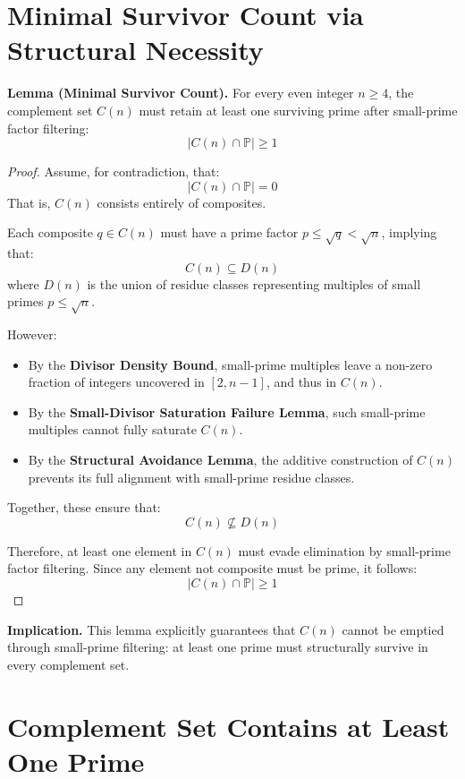 \documentclass[11pt]{article}
\begin{document}
	\section{Minimal Survivor Count via Structural Necessity}
	
	\textbf{Lemma (Minimal Survivor Count).}  
	For every even integer \( n \geq 4 \), the complement set \( C(n) \) must retain at least one surviving prime after small-prime factor filtering:
	\[
	|C(n) \cap \mathbb{P}| \geq 1
	\]
	
	\begin{proof}
		Assume, for contradiction, that:
		\[
		|C(n) \cap \mathbb{P}| = 0
		\]
		That is, \( C(n) \) consists entirely of composites.
		
		Each composite \( q \in C(n) \) must have a prime factor \( p \leq \sqrt{q} < \sqrt{n} \), implying that:
		\[
		C(n) \subseteq D(n)
		\]
		where \( D(n) \) is the union of residue classes representing multiples of small primes \( p \leq \sqrt{n} \).
		
		However:
		\begin{itemize}
			\item By the \textbf{Divisor Density Bound}, small-prime multiples leave a non-zero fraction of integers uncovered in \([2, n-1]\), and thus in \( C(n) \).
			\item By the \textbf{Small-Divisor Saturation Failure Lemma}, such small-prime multiples cannot fully saturate \( C(n) \).
			\item By the \textbf{Structural Avoidance Lemma}, the additive construction of \( C(n) \) prevents its full alignment with small-prime residue classes.
		\end{itemize}
		
		Together, these ensure that:
		\[
		C(n) \not\subseteq D(n)
		\]
		
		Therefore, at least one element in \( C(n) \) must evade elimination by small-prime factor filtering. Since any element not composite must be prime, it follows:
		\[
		|C(n) \cap \mathbb{P}| \geq 1
		\]
	\end{proof}
	
	\textbf{Implication.}  
	This lemma explicitly guarantees that \( C(n) \) cannot be emptied through small-prime filtering: at least one prime must structurally survive in every complement set.


	
	
	\section{Complement Set Contains at Least One Prime}
	
\end{document}
